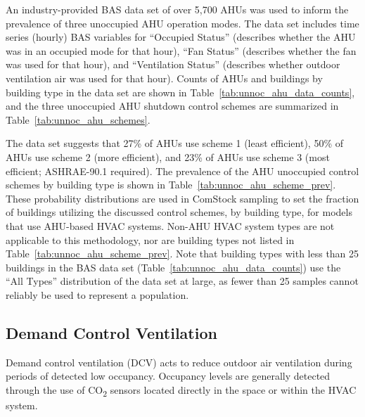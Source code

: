 An industry-provided BAS data set of over 5,700 AHUs was used to inform the prevalence of three unoccupied AHU operation modes. The data set includes time series (hourly) BAS variables for ``Occupied Status'' (describes whether the AHU was in an occupied mode for that hour), ``Fan Status'' (describes whether the fan was used for that hour), and ``Ventilation Status'' (describes whether outdoor ventilation air was used for that hour). Counts of AHUs and buildings by building type in the data set are shown in Table~\ref{tab:unnoc_ahu_data_counts}, and the three unoccupied AHU shutdown control schemes are summarized in Table~\ref{tab:unnoc_ahu_schemes}.

The data set suggests that 27\% of AHUs use scheme 1 (least efficient), 50\% of AHUs use scheme 2 (more efficient), and 23\% of AHUs use scheme 3 (most efficient; ASHRAE-90.1 required). The prevalence of the AHU unoccupied control schemes by building type is shown in Table~\ref{tab:unnoc_ahu_scheme_prev}. These probability distributions are used in ComStock sampling to set the fraction of buildings utilizing the discussed control schemes, by building type, for models that use AHU-based HVAC systems. Non-AHU HVAC system types are not applicable to this methodology, nor are building types not listed in Table~\ref{tab:unnoc_ahu_scheme_prev}. Note that building types with less than 25 buildings in the BAS data set (Table~\ref{tab:unnoc_ahu_data_counts}) use the ``All Types'' distribution of the data set at large, as fewer than 25 samples cannot reliably be used to represent a population.



\subsection{Demand Control Ventilation}

Demand control ventilation (DCV) acts to reduce outdoor air ventilation during periods of detected low occupancy. Occupancy levels are generally detected through the use of CO\textsubscript{2} sensors located directly in the space or within the HVAC system.

